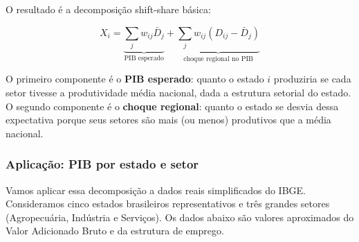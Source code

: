 \documentclass[
]{article}
\begin{document}
O resultado é a decomposição shift-share básica:

\begin{equation}
X_i = \underbrace{\sum_j w_{ij}\bar{D}_{j}}_{\text{PIB esperado}} + \underbrace{\sum_j w_{ij}(D_{ij} - \bar{D}_{j})}_{\text{choque regional no PIB}}
\label{eq:ss-decomp-final}
\end{equation}

O primeiro componente é o \textbf{PIB esperado}: quanto o estado \(i\) produziria se cada setor tivesse a produtividade média nacional, dada a estrutura setorial do estado. O segundo componente é o \textbf{choque regional}: quanto o estado se desvia dessa expectativa porque seus setores são mais (ou menos) produtivos que a média nacional.

\subsubsection{Aplicação: PIB por estado e setor}\label{aplicauxe7uxe3o-pib-por-estado-e-setor}

Vamos aplicar essa decomposição a dados reais simplificados do IBGE. Consideramos cinco estados brasileiros representativos e três grandes setores (Agropecuária, Indústria e Serviços). Os dados abaixo são valores aproximados do Valor Adicionado Bruto e da estrutura de emprego.
\end{document}
